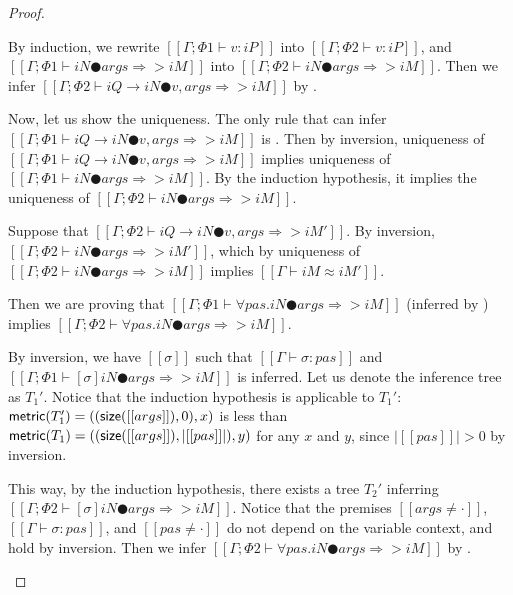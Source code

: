 \begin{proof}
\begin{caseof}
            By induction, we rewrite $[[Γ ; Φ1 ⊢ v : iP]]$ into $[[Γ ; Φ2 ⊢ v : iP]]$, 
            and $[[Γ ; Φ1 ⊢ iN ● args ⇒> iM]]$ into $[[Γ ; Φ2 ⊢ iN ● args ⇒> iM]]$.
            Then we infer $[[Γ ; Φ2 ⊢ iQ → iN ● v, args ⇒> iM]]$ by .

            Now, let us show the uniqueness.
            The only rule that can infer $[[Γ ; Φ1 ⊢ iQ → iN ● v, args ⇒> iM]]$
            is .
            Then by inversion, 
            uniqueness of $[[Γ ; Φ1 ⊢ iQ → iN ● v, args ⇒> iM]]$ implies
            uniqueness of $[[Γ ; Φ1 ⊢ iN ● args ⇒> iM]]$. By 
            the induction hypothesis, it implies the uniqueness of 
            $[[Γ ; Φ2 ⊢ iN ● args ⇒> iM]]$.


            Suppose that 
            $[[Γ ; Φ2 ⊢ iQ → iN ● v, args ⇒> iM']]$.
            By inversion, $[[Γ ; Φ2 ⊢ iN ● args ⇒> iM']]$, 
            which by uniqueness of $[[Γ ; Φ2 ⊢ iN ● args ⇒> iM]]$ implies
            $[[Γ ⊢ iM ≈ iM']]$.

        \item {}
            Then we are proving that
            $[[Γ ; Φ1 ⊢ ∀pas.iN ● args ⇒> iM]]$ (inferred by )
            implies $[[Γ ; Φ2 ⊢ ∀pas.iN ● args ⇒> iM]]$.

            By inversion, we have $[[σ]]$ such that $[[Γ ⊢ σ :{pas}]]$ and
            $[[Γ ; Φ1 ⊢ [σ]iN ● args ⇒> iM]]$ is inferred.
            Let us denote the inference tree as $T_1'$.
            Notice that the induction hypothesis is applicable to $T_1'$:
            $\mathsf{metric}(T_1') = ((\mathsf{size}([[args]]), 0), x)$ is less than 
            $\mathsf{metric}(T_1) = ((\mathsf{size}([[args]]), |[[pas]]|), y)$ for any $x$ and $y$,
            since $|[[pas]]| > 0$ by inversion.

            This way, by the induction hypothesis, 
            there exists a tree $T_2'$ inferring
            $[[Γ ; Φ2 ⊢ [σ]iN ● args ⇒> iM]]$.
            Notice that the premises $[[args ≠ ·]]$, $[[Γ ⊢ σ :{pas}]]$,
            and $[[pas ≠ ·]]$ do not depend on the variable context,
            and hold by inversion.
            Then we infer $[[Γ ; Φ2 ⊢ ∀pas.iN ● args ⇒> iM]]$ by .
    \end{caseof}
\end{proof}
